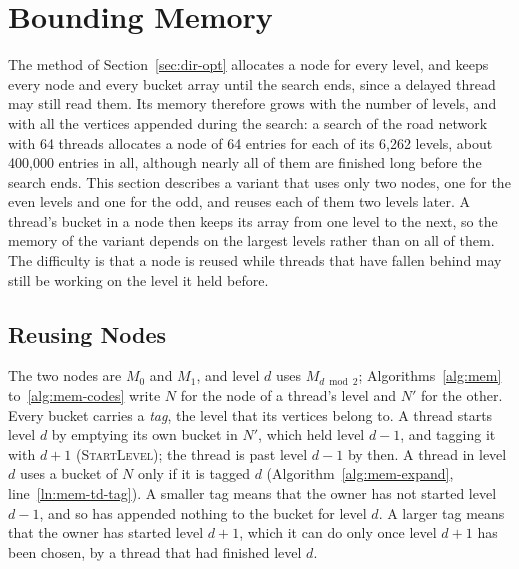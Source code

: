 \section{Bounding Memory}
\label{sec:variants}

The method of Section~\ref{sec:dir-opt} allocates a node for every level, and keeps every node and every bucket array until the search ends, since a delayed thread may still read them. Its memory therefore grows with the number of levels, and with all the vertices appended during the search: a search of the road network with 64 threads allocates a node of 64 entries for each of its 6,262 levels, about 400,000 entries in all, although nearly all of them are finished long before the search ends. This section describes a variant that uses only two nodes, one for the even levels and one for the odd, and reuses each of them two levels later. A thread's bucket in a node then keeps its array from one level to the next, so the memory of the variant depends on the largest levels rather than on all of them. The difficulty is that a node is reused while threads that have fallen behind may still be working on the level it held before.

\subsection{Reusing Nodes}
\label{sec:mem-reuse}

The two nodes are $M_0$ and $M_1$, and level $d$ uses $M_{d \bmod 2}$; Algorithms~\ref{alg:mem} to~\ref{alg:mem-codes} write $N$ for the node of a thread's level and $N'$ for the other. Every bucket carries a \emph{tag}, the level that its vertices belong to. A thread starts level $d$ by emptying its own bucket in $N'$, which held level $d-1$, and tagging it with $d+1$ (\textsc{StartLevel}); the thread is past level $d-1$ by then. A thread in level $d$ uses a bucket of $N$ only if it is tagged $d$ (Algorithm~\ref{alg:mem-expand}, line~\ref{ln:mem-td-tag}). A smaller tag means that the owner has not started level $d-1$, and so has appended nothing to the bucket for level $d$. A larger tag means that the owner has started level $d+1$, which it can do only once level $d+1$ has been chosen, by a thread that had finished level $d$.

